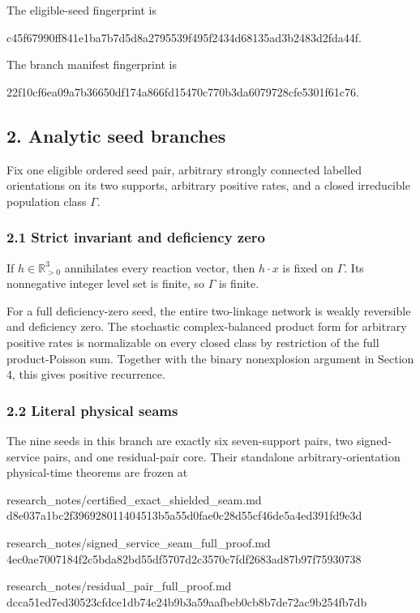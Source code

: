 The eligible-seed fingerprint is

\begin{CodeBlock}
c45f67990ff841e1ba7b7d5d8a2795539f495f2434d68135ad3b2483d2fda44f.
\end{CodeBlock}

The branch manifest fingerprint is

\begin{CodeBlock}
22f10cf6ea09a7b36650df174a866fd15470c770b3da6079728cfe5301f61c76.
\end{CodeBlock}

\subsection{2. Analytic seed branches}

Fix one eligible ordered seed pair, arbitrary strongly connected
labelled orientations on its two supports, arbitrary positive rates, and
a closed irreducible population class \(\Gamma\).

\subsubsection{2.1 Strict invariant and deficiency
zero}

If \(h\in\mathbb R_{>0}^3\) annihilates every reaction vector, then
\(h\cdot x\) is fixed on \(\Gamma\). Its nonnegative integer level set
is finite, so \(\Gamma\) is finite.

For a full deficiency-zero seed, the entire two-linkage network is
weakly reversible and deficiency zero. The stochastic complex-balanced
product form for arbitrary positive rates is normalizable on every
closed class by restriction of the full product-Poisson sum. Together
with the binary nonexplosion argument in Section 4, this gives positive
recurrence.

\subsubsection{2.2 Literal physical seams}

The nine seeds in this branch are exactly six seven-support pairs, two
signed-service pairs, and one residual-pair core. Their standalone
arbitrary-orientation physical-time theorems are frozen at

\begin{CodeBlock}
research_notes/certified_exact_shielded_seam.md
d8e037a1bc2f396928011404513b5a55d0fae0c28d55cf46de5a4ed391fd9e3d

research_notes/signed_service_seam_full_proof.md
4ec0ae7007184f2c5bda82bd55df5707d2c3570c7fdf2683ad87b97f75930738

research_notes/residual_pair_full_proof.md
dcca51ed7ed30523cfdce1db74e24b9b3a59aafbeb0cb8b7de72ac9b254fb7db
\end{CodeBlock}


